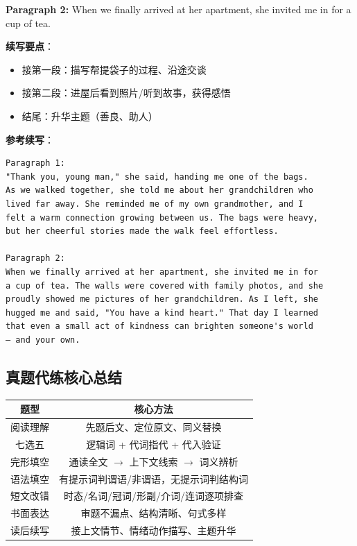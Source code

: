 \medskip

\textbf{Paragraph 2:} When we finally arrived at her apartment, she invited me in for a cup of tea. \underline{\hspace{8cm}}

\medskip

\textbf{续写要点}：
\begin{itemize}
  \item 接第一段：描写帮提袋子的过程、沿途交谈
  \item 接第二段：进屋后看到照片/听到故事，获得感悟
  \item 结尾：升华主题（善良、助人）
\end{itemize}

\textbf{参考续写}：

\begin{verbatim}
Paragraph 1:
"Thank you, young man," she said, handing me one of the bags. 
As we walked together, she told me about her grandchildren who 
lived far away. She reminded me of my own grandmother, and I 
felt a warm connection growing between us. The bags were heavy, 
but her cheerful stories made the walk feel effortless.

Paragraph 2:
When we finally arrived at her apartment, she invited me in for 
a cup of tea. The walls were covered with family photos, and she 
proudly showed me pictures of her grandchildren. As I left, she 
hugged me and said, "You have a kind heart." That day I learned 
that even a small act of kindness can brighten someone's world 
— and your own.
\end{verbatim}

\subsection{真题代练核心总结}

\begin{center}
\begin{tabular}{c|c}
\textbf{题型} & \textbf{核心方法} \\ \toprule
阅读理解 & 先题后文、定位原文、同义替换 \\
七选五 & 逻辑词 + 代词指代 + 代入验证 \\
完形填空 & 通读全文 $\to$ 上下文线索 $\to$ 词义辨析 \\
语法填空 & 有提示词判谓语/非谓语，无提示词判结构词 \\
短文改错 & 时态/名词/冠词/形副/介词/连词逐项排查 \\
书面表达 & 审题不漏点、结构清晰、句式多样 \\
读后续写 & 接上文情节、情绪动作描写、主题升华 \\
\bottomrule
\end{tabular}
\end{center}
